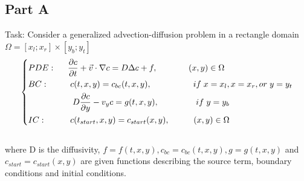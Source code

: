 \documentclass[12pt]{article}
\begin{document}
\subsection*{Part A}
Task: Consider a generalized advection-diffusion problem in a rectangle domain $\Omega = [x_l;x_r] \times [y_b;y_t]$
\begin{equation}
\begin{dcases}
PDE:\hspace{.5cm}\frac{\partial c}{\partial t} + \vec{v} \cdot \nabla c = D\Delta c + f,\hspace{1.3cm}(x,y) \in \Omega\\
BC:\hspace{.9cm}c(t,x,y) = c_{bc}(t,x,y),\hspace{1.74cm} if \hspace{.1cm}x = x_l, x = x_r, or \hspace{.1cm}y = y_t\\
\hspace{1.85cm}D\frac{\partial c}{\partial y} - v_yc = g(t,x,y),\hspace{1.55cm}if \hspace{.1cm}y = y_b\\
IC:\hspace{1cm}c(t_{start},x,y) = c_{start}(x,y),\hspace{1cm}(x,y) \in \Omega
\end{dcases}
\end{equation}
\\
where D is the diffusivity, $f = f(t,x,y), c_{bc} = c_{bc}(t,x,y), g = g(t,x,y)$ and $c_{start} = c_{start}(x,y)$ are given functions describing the source term, boundary conditions and initial conditions.
\end{document}
